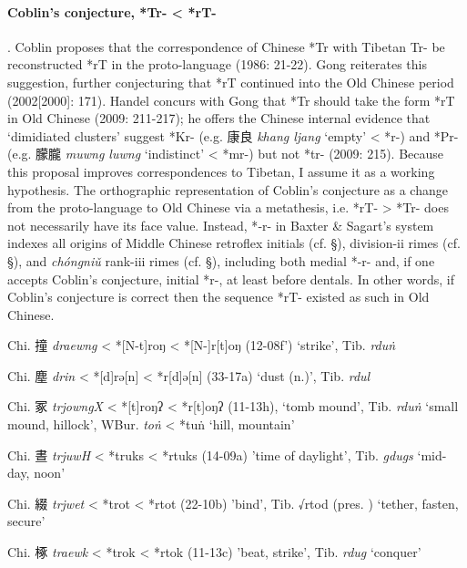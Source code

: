 \paragraph{Coblin's conjecture, *Tr- \textless{} *rT-}. Coblin
proposes that the correspondence of Chinese *Tr with Tibetan Tr- be
reconstructed *rT in the proto-language (1986: 21-22). Gong reiterates
this suggestion, further conjecturing that *rT continued into the Old
Chinese period (2002{[}2000]: 171). Handel concurs with Gong that *Tr
should take the form *rT in Old Chinese (2009: 211-217); he offers the
Chinese internal evidence that `dimidiated clusters' suggest *Kr- (e.g.
康良 \emph{khang ljang} `empty' \textless{} *{}r-) and *Pr- (e.g. 朦朧
 \emph{muwng luwng} `indistinct' \textless{} *mr{}-) but not *tr- (2009:
215). Because this proposal improves cor­re­spon­dences to Tibetan, I
assume it as a working hypothesis. The orthographic representation of
Coblin's conjecture as a change from the proto-language to Old Chinese
via a metathesis, i.e. *rT- \textgreater{} *Tr- does not necessarily
have its face value. Instead, *‑r- in Baxter \& Sagart's system indexes
all origins of Middle Chinese retroflex initials (cf. §), division-ii
rimes (cf. §), and \emph{chóngniǔ} rank-iii rimes (cf. §), including
both medial *-r- and, if one accepts Coblin's conjecture, initial *r-,
at least before dentals. In other words, if Coblin's conjecture is
correct then the sequence *rT- existed as such in Old Chinese.

\begin{description} \item
Chi. 撞 \emph{draewng} \textless{} *[N-t]{}roŋ \textless{}
*[N-]r{[}t]{}oŋ (12-08f') `strike', Tib. {} \emph{rduṅ}
\item
Chi. 塵 \emph{drin} \textless{} *[d]rə[n] \textless{}
*r{[}d]ə[n] (33-17a) `dust (n.)', Tib. {} \emph{rdul}
\item
Chi. 冢 \emph{trjowngX} \textless{} *[t]roŋʔ \textless{}
*r{[}t]oŋʔ (11-13h), `tomb mound', Tib. {} \emph{rduṅ} `small
mound, hillock', WBur. {} \emph{toṅ} \textless{} *tuṅ `hill,
mountain'
\item
Chi. 晝 \emph{trjuwH} \textless{} *truks \textless{} *rtuks (14-09a)
'time of daylight', Tib. {} \emph{gdugs} `mid-day, noon'
\item
Chi. 綴 \emph{trjwet} \textless{} *trot \textless{} *rtot (22-10b)
'bind', Tib. √rtod (pres. {}) `tether, fasten, secure'
\item
Chi. 椓 \emph{traewk} \textless{} *tr{}ok \textless{} *rt{}ok (11-13c)
'beat, strike', Tib. {} \emph{rdug} `conquer'
\end{description}

